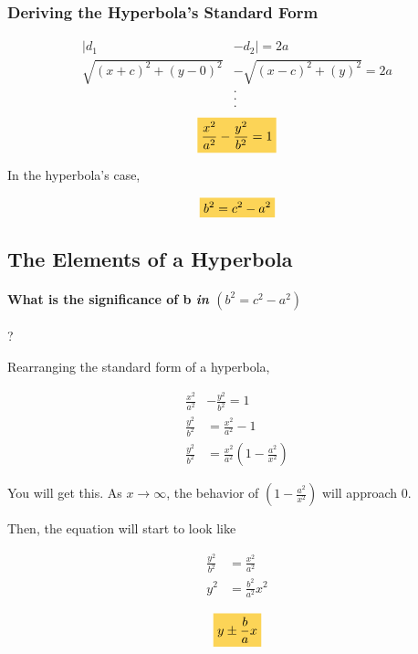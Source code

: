 \documentclass{article}
\newcommand{\highlight}[1]{%
  \colorbox{yellowOrange}{$\displaystyle#1$}}
\begin{document}
\subsubsection{Deriving the Hyperbola's Standard Form}

\begin{align*}
  |d_1 &- d_2| = 2a\\
  \sqrt{(x + c)^2 + (y - 0)^2} &- \sqrt{(x - c)^2 + (y)^2} = 2a\\
  &.\\
  &.\\
  &.
\end{align*}
\begin{equation*}
  \highlight{\frac{x^2}{a^2} - \frac{y^2}{b^2} = 1}
\end{equation*}

In the hyperbola's case,

\begin{equation*}
  \highlight{b^2 = c^2 - a^2}
\end{equation*}

\subsection{The Elements of a Hyperbola}
\paragraph{What is the significance of b \textit{in} $(b^2 = c^2 - a^2)$}?

Rearranging the standard form of a hyperbola,

\begin{align*}
  \frac{x^2}{a^2} &- \frac{y^2}{b^2} = 1\\
  \frac{y^2}{b^2} &= \frac{x^2}{a^2} - 1\\
  \frac{y^2}{b^2} &= \frac{x^2}{a^2}(1 - \frac{a^2}{x^2})
\end{align*}

You will get this. As $x \rightarrow \infty$, the behavior of $(1 - \frac{a^2}{x^2})$ will approach $0$.

Then, the equation will start to look like

\begin{align*}
  \frac{y^2}{b^2} &= \frac{x^2}{a^2}\\
  y^2 &= \frac{b^2}{a^2}x^2\\
\end{align*}
\begin{equation*}
  \highlight{y \pm \frac{b}{a}x}
\end{equation*}
\end{document}
